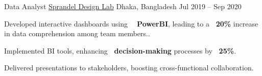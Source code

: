 \documentclass[]{awesome-cv}
\begin{document}
\begin{cventries}
	\cventry
	{Data Analyst}
	{\href{}{Sprandel Design Lab}}
	{Dhaka, Bangladesh}
	{Jul 2019 – Sep 2020}
	{\begin{cvitems}
        \item Developed interactive dashboards using \textbf{~{} PowerBI}, leading to a \textbf{~{}20\%} increase in data comprehension among team members..
        \item Implemented BI tools, enhancing \textbf{~{}decision-making} processes by \textbf{~{}25\%}.     
         \item Delivered presentations to stakeholders, boosting cross-functional collaboration.         
	\end{cvitems}}
		
	
	
	
\end{cventries}
\end{document}
